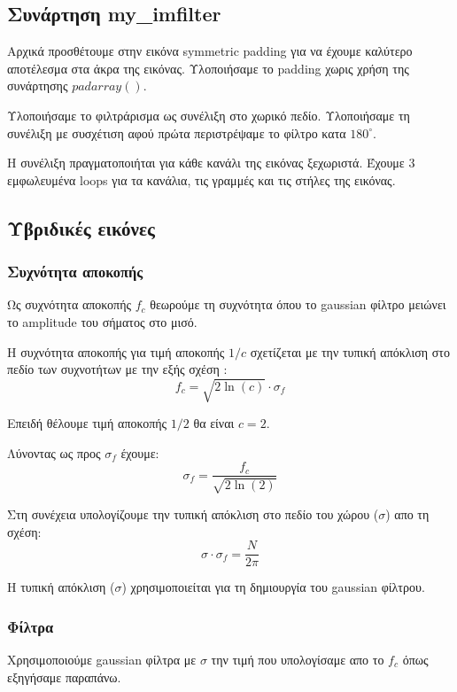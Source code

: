\documentclass[11pt]{scrartcl} %
\begin{document}
\subsection{Συνάρτηση my\_imfilter}

Αρχικά προσθέτουμε στην εικόνα symmetric padding για να έχουμε καλύτερο αποτέλεσμα στα άκρα της εικόνας. Υλοποιήσαμε το padding χωρις χρήση της συνάρτησης $padarray()$.

Υλοποιήσαμε το φιλτράρισμα ως συνέλιξη στο χωρικό πεδίο. Υλοποιήσαμε τη συνέλιξη με συσχέτιση αφού πρώτα περιστρέψαμε το φίλτρο κατα $180^{\circ}$.

Η συνέλιξη πραγματοποιήται για κάθε κανάλι της εικόνας ξεχωριστά. Έχουμε 3 εμφωλευμένα loops για τα κανάλια, τις γραμμές και τις στήλες της εικόνας.


\subsection{Υβριδικές εικόνες}

\subsubsection{Συχνότητα αποκοπής}

Ως συχνότητα αποκοπής $f_c$ θεωρούμε τη συχνότητα όπου το gaussian φίλτρο μειώνει το amplitude του σήματος στο μισό.

Η συχνότητα αποκοπής για τιμή αποκοπής $1/c$ σχετίζεται με την τυπική απόκλιση στο πεδίο των συχνοτήτων με την εξής σχέση \cite{wikipedia_gaussian_filter}:
\[f_c = \sqrt{2\ln(c)}\cdot\sigma_f\]

Επειδή θέλουμε τιμή αποκοπής $1/2$ θα είναι $c = 2$.

Λύνοντας ως προς $\sigma_f$ έχουμε:
\[\sigma_f = \frac{f_c}{\sqrt{2\ln(2)}}\]

Στη συνέχεια υπολογίζουμε την τυπική απόκλιση στο πεδίο του χώρου ($\sigma$) απο τη σχέση:
\[\sigma\cdot\sigma_f=\frac{N}{2\pi}\]

Η τυπική απόκλιση ($\sigma$) χρησιμοποιείται για τη δημιουργία του gaussian φίλτρου.

\subsubsection{Φίλτρα}

Χρησιμοποιούμε gaussian φίλτρα με $\sigma$ την τιμή που υπολογίσαμε απο το $f_c$ όπως εξηγήσαμε παραπάνω.
\end{document}
